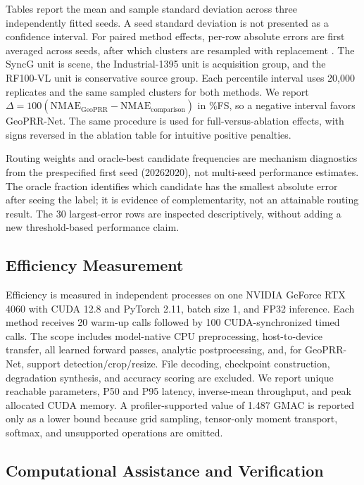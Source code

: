 \documentclass[electronics,article,submit,oneauthor]{Definitions/mdpi}
\newcommand{\modelname}{GeoPRR-Net\xspace}
\newcommand{\nmae}{\mathrm{NMAE}}
\begin{document}
Tables report the mean and sample standard deviation across three independently fitted seeds. A seed standard deviation is not presented as a confidence interval. For paired method effects, per-row absolute errors are first averaged across seeds, after which clusters are resampled with replacement \cite{davison1997bootstrap}. The SyncG unit is scene, the Industrial-1395 unit is acquisition group, and the RF100-VL unit is conservative source group. Each percentile interval uses 20,000 replicates and the same sampled clusters for both methods. We report $\Delta=100(\nmae_{\mathrm{GeoPRR}}-\nmae_{\mathrm{comparison}})$ in \%FS, so a negative interval favors \modelname. The same procedure is used for full-versus-ablation effects, with signs reversed in the ablation table for intuitive positive penalties.

Routing weights and oracle-best candidate frequencies are mechanism diagnostics from the prespecified first seed (20262020), not multi-seed performance estimates. The oracle fraction identifies which candidate has the smallest absolute error after seeing the label; it is evidence of complementarity, not an attainable routing result. The 30 largest-error rows are inspected descriptively, without adding a new threshold-based performance claim.

\subsection{Efficiency Measurement}
\label{subsec:efficiency_protocol}

Efficiency is measured in independent processes on one NVIDIA GeForce RTX 4060 with CUDA 12.8 and PyTorch 2.11, batch size 1, and FP32 inference. Each method receives 20 warm-up calls followed by 100 CUDA-synchronized timed calls. The scope includes model-native CPU preprocessing, host-to-device transfer, all learned forward passes, analytic postprocessing, and, for \modelname, support detection/crop/resize. File decoding, checkpoint construction, degradation synthesis, and accuracy scoring are excluded. We report unique reachable parameters, P50 and P95 latency, inverse-mean throughput, and peak allocated CUDA memory. A profiler-supported value of 1.487 GMAC is reported only as a lower bound because grid sampling, tensor-only moment transport, softmax, and unsupported operations are omitted.

\subsection{Computational Assistance and Verification}
\label{subsec:computational_assistance}
\end{document}
